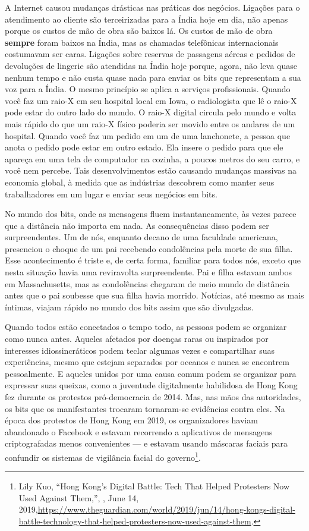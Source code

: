 A Internet causou mudanças drásticas nas práticas dos negócios. Ligações para o
atendimento ao cliente são terceirizadas para a Índia hoje em dia, não apenas
porque os custos de mão de obra são baixos lá. Os custos de mão de obra
\textbf{sempre} foram baixos na Índia, mas as chamadas telefônicas
internacionais costumavam ser caras. Ligações sobre reservas de passagens aéreas
e pedidos de devoluções de lingerie são atendidas na Índia hoje porque, agora,
não leva quase nenhum tempo e não custa quase nada para enviar os bits que
representam a sua voz para a Índia. O mesmo princípio se aplica a serviços
profissionais. Quando você faz um raio-X em seu hospital local em Iowa, o
radiologista que lê o raio-X pode estar do outro lado do mundo. O raio-X digital
circula pelo mundo e volta mais rápido do que um raio-X físico poderia ser
movido entre os andares de um hospital. Quando você faz um pedido em um
 de uma lanchonete, a pessoa que anota o pedido pode estar
em outro estado. Ela insere o pedido para que ele apareça em uma tela de
computador na cozinha, a poucos metros do seu carro, e você nem percebe. Tais
desenvolvimentos estão causando mudanças massivas na economia global, à medida
que as indústrias descobrem como manter seus trabalhadores em um lugar e enviar
seus negócios em bits.

No mundo dos bits, onde as mensagens fluem instantaneamente, às vezes parece que
a distância não importa em nada. As consequências disso podem ser
surpreendentes. Um de nós, enquanto decano de uma faculdade americana,
presenciou o choque de um pai recebendo condolências pela morte de sua
filha. Esse acontecimento é triste e, de certa forma, familiar para todos nós,
exceto que nesta situação havia uma reviravolta surpreendente. Pai e filha
estavam ambos em Massachusetts, mas as condolências chegaram de meio mundo de
distância antes que o pai soubesse que sua filha havia morrido. Notícias, até
mesmo as mais íntimas, viajam rápido no mundo dos bits assim que são divulgadas.

Quando todos estão conectados o tempo todo, as pessoas podem se organizar como
nunca antes. Aqueles afetados por doenças raras ou inspirados por interesses
idiossincráticos podem teclar algumas vezes e compartilhar suas experiências,
mesmo que estejam separados por oceanos e nunca se encontrem pessoalmente. E
aqueles unidos por uma causa comum podem se organizar para expressar suas
queixas, como a juventude digitalmente habilidosa de Hong Kong fez durante os
protestos pró-democracia de 2014. Mas, nas mãos das autoridades, os bits que os
manifestantes trocaram tornaram-se evidências contra eles. Na época dos
protestos de Hong Kong em 2019, os organizadores haviam abandonado o Facebook e
estavam recorrendo a aplicativos de mensagens criptografadas menos convenientes
--- e estavam usando máscaras faciais para confundir os sistemas de vigilância
facial do governo\footnote{Lily Kuo, ``Hong Kong's Digital Battle: Tech That
Helped Protesters Now Used Against Them,'', , June 14,
2019,\url{https://www.theguardian.com/world/2019/jun/14/hong-kongs-digital-battle-technology-that-helped-protesters-now-used-against-them}.}.

